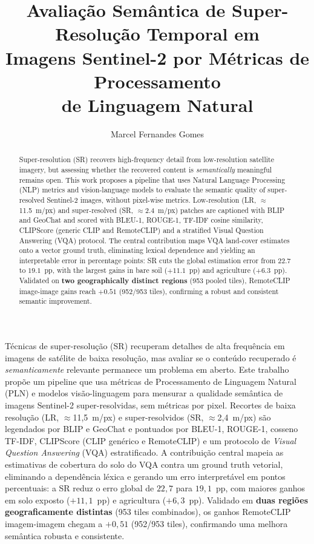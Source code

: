 \documentclass[12pt]{article}
\title{Avaliação Semântica de Super-Resolução Temporal em\\
       Imagens Sentinel-2 por Métricas de Processamento\\
       de Linguagem Natural}
\author{Marcel Fernandes Gomes\inst{1}}
\begin{document}
\maketitle

\begin{abstract}
Super-resolution (SR) recovers high-frequency detail from low-resolution
satellite imagery, but assessing whether the recovered content is
\emph{semantically} meaningful remains open. This work proposes a pipeline
that uses Natural Language Processing (NLP) metrics and vision-language
models to evaluate the semantic quality of super-resolved Sentinel-2
images, without pixel-wise metrics. Low-resolution (LR, $\approx$11.5~m/px)
and super-resolved (SR, $\approx$2.4~m/px) patches are captioned with BLIP
and GeoChat and scored with BLEU-1, ROUGE-1, TF-IDF cosine similarity,
CLIPScore (generic CLIP and RemoteCLIP) and a stratified Visual Question
Answering (VQA) protocol. The central contribution maps VQA land-cover
estimates onto a vector ground truth, eliminating lexical dependence and
yielding an interpretable error in percentage points: SR cuts the global
estimation error from $22.7$ to $19.1$~pp, with the largest gains in bare
soil ($+11.1$~pp) and agriculture ($+6.3$~pp). Validated on \textbf{two
geographically distinct regions} (953 pooled tiles), RemoteCLIP
image-image gains reach $+0.51$ (952/953 tiles), confirming a robust and
consistent semantic improvement.
\end{abstract}

\begin{resumo}
Técnicas de super-resolução (SR) recuperam detalhes de alta frequência
em imagens de satélite de baixa resolução, mas avaliar se o conteúdo
recuperado é \emph{semanticamente} relevante permanece um problema em
aberto. Este trabalho propõe um pipeline que usa métricas de
Processamento de Linguagem Natural (PLN) e modelos visão-linguagem para
mensurar a qualidade semântica de imagens Sentinel-2 super-resolvidas,
sem métricas por pixel. Recortes de baixa resolução
(LR, $\approx$11,5~m/px) e super-resolvidos (SR, $\approx$2,4~m/px) são
legendados por BLIP e GeoChat e pontuados por BLEU-1, ROUGE-1, cosseno
TF-IDF, CLIPScore (CLIP genérico e RemoteCLIP) e um protocolo de
\textit{Visual Question Answering} (VQA) estratificado. A contribuição
central mapeia as estimativas de cobertura do solo do VQA contra um ground
truth vetorial, eliminando a dependência léxica e gerando um erro
interpretável em pontos percentuais: a SR reduz o erro global de
$22{,}7$ para $19{,}1$~pp, com maiores ganhos em solo exposto
($+11{,}1$~pp) e agricultura ($+6{,}3$~pp). Validado em \textbf{duas
regiões geograficamente distintas} (953 tiles combinados), os ganhos
RemoteCLIP imagem-imagem chegam a $+0{,}51$ (952/953 tiles), confirmando
uma melhora semântica robusta e consistente.
\end{resumo}
\end{document}
